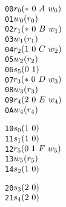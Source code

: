 \newsavebox{\boxTZero}
\begin{lrbox}{\boxTZero}
\begin{minipage}[t]{0.4\linewidth}
\large
\begin{alltt}
00 \(r\sb{0}(\ast\ 0\ A\ w\sb{0})\)
01 \(w\sb{0}(r\sb{0})\)
02 \(r\sb{1}(\ast\ 0\ B\ w\sb{1})\)
03 \(w\sb{1}(r\sb{1})\)
04 \(r\sb{2}(1\ 0\ C\ w\sb{2})\)
05 \(w\sb{2}(r\sb{2})\)
06 \(s\sb{5}(0\ 1)\)
07 \(r\sb{3}(\ast\ 0\ D\ w\sb{3})\)
08 \(w\sb{3}(r\sb{3})\)
09 \(r\sb{4}(2\ 0\ E\ w\sb{4})\)
0A \(w\sb{4}(r\sb{4})\)


\end{alltt}
\end{minipage}
\end{lrbox}

\newsavebox{\boxTOne}
\begin{lrbox}{\boxTOne}
\begin{minipage}[t]{0.4\linewidth}
\large
\begin{alltt}
10 \(s\sb{0}(1\ 0)\)
11 \(s\sb{1}(1\ 0)\)
12 \(r\sb{5}(0\ 1\ F\ w\sb{5})\)
13 \(w\sb{5}(r\sb{5})\)
14 \(s\sb{2}(1\ 0)\)
\end{alltt}
\end{minipage}
\end{lrbox}

\newsavebox{\boxTTwo}
\begin{lrbox}{\boxTTwo}
\begin{minipage}[t]{0.4\linewidth}
\large
\begin{alltt}
20 \(s\sb{3}(2\ 0)\)
21 \(s\sb{4}(2\ 0)\)\end{alltt}
\end{minipage}
\end{lrbox}


\newcommand\examplefigone{
\begin{figure*}[tb]
\begin{center}
\setlength{\tabcolsep}{2pt}
\begin{tabular}[t]{c|c|c}
$\mathit{p_0}$ & $\mathit{p_1}$ & $\mathit{p_2}$ \\
\hline
\scalebox{0.8}{\usebox{\boxTZero}}&
\scalebox{0.8}{\usebox{\boxTOne}} &
\scalebox{0.8}{\usebox{\boxTTwo}}\\
\end{tabular}
\end{center}
\caption{A deadlock caused by orphaned receive.}
\label{fig:example}
\end{figure*}
}
